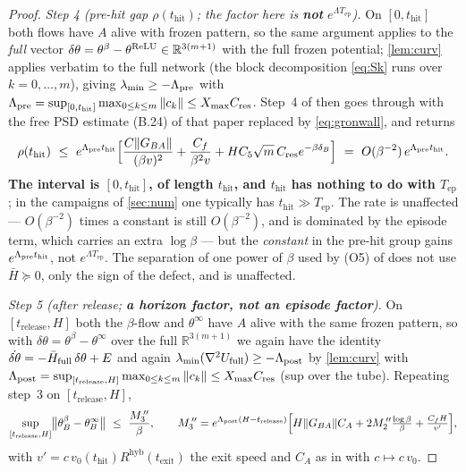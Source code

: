 \documentclass[11pt]{article}
\theoremstyle{remark}
\newcommand{\R}{\mathbb{R}}
\newcommand{\thit}{t_{\mathrm{hit}}}
\newcommand{\texit}{t_{\mathrm{exit}}}
\newcommand{\trel}{t_{\mathrm{release}}}
\newcommand{\Tep}{T_{\mathrm{ep}}}
\newcommand{\hyb}{\mathrm{hyb}}
\newcommand{\Cres}{C_{\mathrm{res}}}
\newcommand{\Xmax}{X_{\max}}
\begin{document}
\begin{proof}
\emph{Step 4 (pre-hit gap $\rho(\thit)$; the factor here is \textbf{not}
$e^{\Lambda\Tep}$).} On $[0,\thit]$ both flows have $A$ alive with frozen
pattern, so the same argument applies to the \emph{full} vector
$\delta\theta=\theta^\beta-\theta^{\rm ReLU}\in\R^{3(m+1)}$ with the full frozen
potential; \cref{lem:curv} applies verbatim to the full network (the block
decomposition \eqref{eq:Sk} runs over $k=0,\dots,m$), giving
$\lambda_{\min}\ge-\Lambda_{\rm pre}$ with
$\Lambda_{\rm pre}=\sup_{[0,\thit]}\max_{0\le k\le m}\|c_k\|\le\Xmax\Cres$.
Step~4 of \cite[L2$'$]{paper} then goes through with the free PSD estimate
(B.24) of that paper replaced by \eqref{eq:gronwall}, and returns
\[
\rho(\thit)\ \le\ e^{\Lambda_{\rm pre}\thit}
\Bigl[\frac{C\|G_{BA}\|}{(\beta v)^2}+\frac{C_f}{\beta^2v}
+HC_5\sqrt m\,\Cres e^{-\beta\delta_B}\Bigr]
\ =\ O(\beta^{-2})\,e^{\Lambda_{\rm pre}\thit}.
\]
\textbf{The interval is $[0,\thit]$, of length $\thit$, and $\thit$ has nothing
to do with $\Tep$}; in the campaigns of \cref{sec:num} one typically has
$\thit\gg\Tep$. The rate is unaffected --- $O(\beta^{-2})$ times a constant is
still $O(\beta^{-2})$, and is dominated by the episode term, which carries an
extra $\log\beta$ --- but the \emph{constant} in the pre-hit group gains
$e^{\Lambda_{\rm pre}\thit}$, not $e^{\Lambda\Tep}$. The separation of one power
of $\beta$ used by (O5) of \cite{paper} does not use $\bar H\succeq0$, only the
sign of the defect, and is unaffected.

\emph{Step 5 (after release; \textbf{a horizon factor, not an episode factor}).}
On $[\trel,H]$ both the $\beta$-flow and $\theta^\infty$ have $A$ alive with the
same frozen pattern, so with $\delta\theta=\theta^\beta-\theta^\infty$ over the
full $\R^{3(m+1)}$ we again have the identity
$\dot{\delta\theta}=-\bar H_{\rm full}\,\delta\theta+E$ and again
$\lambda_{\min}(\nabla^2U_{\rm full})\ge-\Lambda_{\rm post}$ by \cref{lem:curv}
with $\Lambda_{\rm post}=\sup_{[\trel,H]}\max_{0\le k\le m}\|c_k\|\le\Xmax\Cres$
(sup over the tube). Repeating step~3 on $[\trel,H]$,
\begin{equation}\label{eq:ivB}
\sup_{[\trel,H]}\bigl\|\theta_B^\beta-\theta_B^{\infty}\bigr\|
\ \le\ \frac{M_3^{\,\prime\prime}}{\beta},
\qquad
M_3^{\,\prime\prime}=e^{\Lambda_{\rm post}(H-\trel)}
\Bigl[H\|G_{BA}\|C_A+2M_2^{\,\prime\prime}\tfrac{\log\beta}{\beta}+\tfrac{C_fH}{v'}\Bigr],
\end{equation}
with $v'=c\,v_0(\thit)R^{\hyb}(\texit)$ the exit speed and $C_A$ as in
\cite[(B.30)]{paper} with $c\mapsto c\,v_0$.
\end{proof}
\end{document}
